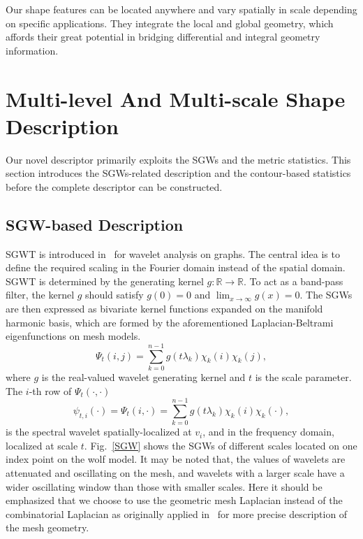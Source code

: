 Our shape features can be located anywhere and vary spatially in scale
depending on specific applications. They integrate the local and global
geometry, which affords their great potential in bridging differential
and integral geometry information.

\section{Multi-level And Multi-scale Shape Description}
\label{sec:Des}

Our novel descriptor primarily exploits the SGWs and the metric
statistics. This section introduces the SGWs-related description and
the contour-based statistics before the complete descriptor can be
constructed.

\subsection{SGW-based Description}

SGWT is introduced in~\cite{Hammond2011} for wavelet analysis
on graphs. The central idea is to define the required scaling in the
Fourier domain instead of the spatial domain. SGWT is determined by
the generating kernel $g \colon \mathbb{R} \rightarrow \mathbb{R}$. To
act as a band-pass filter, the kernel $g$ should satisfy $g(0) = 0$
and $\lim_{x \rightarrow \infty} g(x) = 0$. The SGWs are then
expressed as bivariate kernel functions
expanded on the manifold harmonic basis, which are formed by the
aforementioned Laplacian-Beltrami eigenfunctions on mesh models.
\begin{equation}
\label{eq:SGW}
\Psi_{t}(i,j)=\sum_{k=0}^{n-1}g(t\lambda_k) \chi_k(i)\chi_k(j),
\end{equation}
where $g$ is the real-valued wavelet generating kernel and $t$ is the
scale parameter. The $i$-th row of $\Psi_{t}(\cdot,\cdot)$
\begin{equation}
\label{eq:SGW_vert}
\psi_{t,i}(\cdot) = \Psi_{t}(i,\cdot)=\sum_{k=0}^{n-1}g(t\lambda_k) \chi_k(i)\chi_k(\cdot),
\end{equation}
is the spectral wavelet spatially-localized at $v_i$, and in the
frequency domain, localized at scale $t$. Fig.~\ref{SGW} shows the
SGWs of different scales located on one index point on the wolf model.
It may be noted that, the values of wavelets are attenuated and
oscillating on the mesh, and wavelets with a larger scale have a wider
oscillating window than those with smaller scales. Here it should be emphasized
that we choose to use the geometric mesh Laplacian instead of the combinatorial
Laplacian as originally applied in~\cite{Hammond2011} for more precise description
of the mesh geometry.


